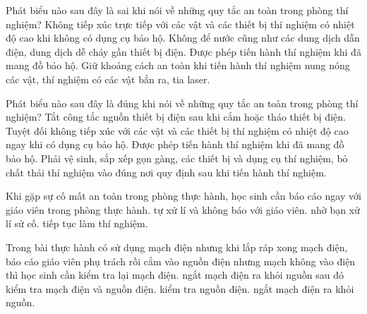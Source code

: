 \begin{ex}
Phát biểu nào sau đây là sai khi nói về những quy tắc an toàn trong phòng thí nghiệm?
\choice
{Không tiếp xúc trực tiếp với các vật và các thiết bị thí nghiệm có nhiệt độ cao khi không có dụng cụ bảo hộ.}
{Không để nước cũng như các dung dịch dẫn điện, dung dịch dễ cháy gần thiết bị điện.}
{\True Được phép tiến hành thí nghiệm khi đã mang đồ bảo hộ.}
{Giữ khoảng cách an toàn khi tiến hành thí nghiệm nung nóng các vật, thí nghiệm có các vật bắn ra, tia laser.}
\end{ex}

\begin{ex}
Phát biểu nào sau đây là đúng khi nói về những quy tắc an toàn trong phòng thí nghiệm?
\choice
{Tắt công tắc nguồn thiết bị điện sau khi cắm hoặc tháo thiết bị điện.}
{Tuyệt đối không tiếp xúc với các vật và các thiết bị thí nghiệm có nhiệt độ cao ngay khi có dụng cụ bảo hộ.}
{Được phép tiến hành thí nghiệm khi đã mang đồ bảo hộ.}
{\True Phải vệ sinh, sắp xếp gọn gàng, các thiết bị và dụng cụ thí nghiệm, bỏ chất thải thí nghiệm vào đúng nơi quy định sau khi tiến hành thí nghiệm.}
\end{ex}

\begin{ex}
Khi gặp sự cố mất an toàn trong phòng thực hành, học sinh cần
\choice
{\True báo cáo ngay với giáo viên trong phòng thực hành.}
{tự xử lí và không báo với giáo viên.}
{nhờ bạn xử lí sử cố.}
{tiếp tục làm thí nghiệm.}
\end{ex}

\begin{ex}
Trong bài thực hành có sử dụng mạch điện nhưng khi lắp ráp xong mạch điện, báo cáo giáo viên phụ trách rồi cắm vào nguồn điện nhưng mạch không vào điện thì học sinh cần
\choice
{kiểm tra lại mạch điện.}
{\True ngắt mạch điện ra khỏi nguồn sau đó kiểm tra mạch điện và nguồn điện.}
{kiểm tra nguồn điện.}
{ngắt mạch điện ra khỏi nguồn.}
\end{ex}

